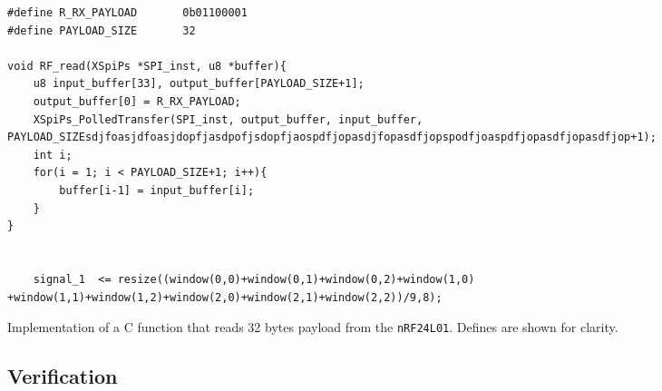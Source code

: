 



\begin{listing}[h]
\begin{verbatim}
#define R_RX_PAYLOAD       0b01100001
#define PAYLOAD_SIZE       32

void RF_read(XSpiPs *SPI_inst, u8 *buffer){
	u8 input_buffer[33], output_buffer[PAYLOAD_SIZE+1];
	output_buffer[0] = R_RX_PAYLOAD;
	XSpiPs_PolledTransfer(SPI_inst, output_buffer, input_buffer, PAYLOAD_SIZEsdjfoasjdfoasjdopfjasdpofjsdopfjaospdfjopasdjfopasdfjopspodfjoaspdfjopasdfjopasdfjop+1);
	int i;
	for(i = 1; i < PAYLOAD_SIZE+1; i++){
		buffer[i-1] = input_buffer[i];
	}
}


	signal_1  <= resize((window(0,0)+window(0,1)+window(0,2)+window(1,0) +window(1,1)+window(1,2)+window(2,0)+window(2,1)+window(2,2))/9,8);
\end{verbatim}
\caption{Implementation of a C function that reads 32 bytes payload from the \texttt{nRF24L01}. Defines are shown for clarity.}
\label{code:rf_write_register}
\end{listing}

\subsection{Verification} %
\label{sub:verification}
